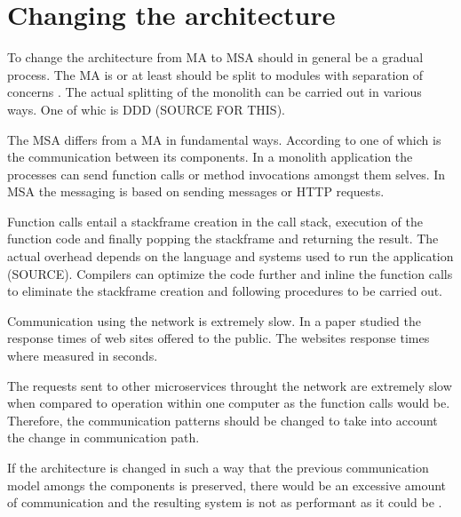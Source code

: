 \section{Changing the architecture}
\begin{sloppypar}
    To change the architecture from MA to MSA should in general be a gradual process. The 
    MA is or at least should be  split to modules with separation of concerns 
    \citep{secchalmsa}. The actual splitting of the monolith can be carried out
     in various ways. One of whic is DDD (SOURCE FOR THIS).
\end{sloppypar}
\begin{sloppypar}
    The MSA differs from a MA in fundamental ways. According to \citet{fowlerlewisms} 
    one of which is the communication between its components. In a monolith 
    application the processes can send function calls or method invocations 
    amongst them selves. In MSA the messaging is based on sending messages or 
    HTTP requests.
\end{sloppypar}
\begin{sloppypar}
    Function calls entail a stackframe creation in the call stack, execution of 
    the function code and finally popping the stackframe and returning the result. 
    The actual overhead depends on the language and systems used to run the 
    application (SOURCE). Compilers can optimize the code further and inline 
    the function calls to eliminate the stackframe creation and following 
    procedures to be carried out.
\end{sloppypar}
\begin{sloppypar}
    Communication using the network is extremely slow. In a paper \citet{webdelays} 
    studied the response times of web sites offered to the public. The websites 
    response times where measured in seconds.
\end{sloppypar}
\begin{sloppypar}
    The requests sent to other microservices throught the network are extremely 
    slow when compared to operation within one computer as the function calls 
    would be. Therefore, the communication patterns should be changed to take 
    into account the change in communication path.
\end{sloppypar}
\begin{sloppypar}
    If the architecture is changed in such a way that the previous communication 
    model amongs the components is preserved, there would be an excessive amount 
    of communication and the resulting system is not as performant as it could 
    be \citep{fowlerlewisms}.
\end{sloppypar}

